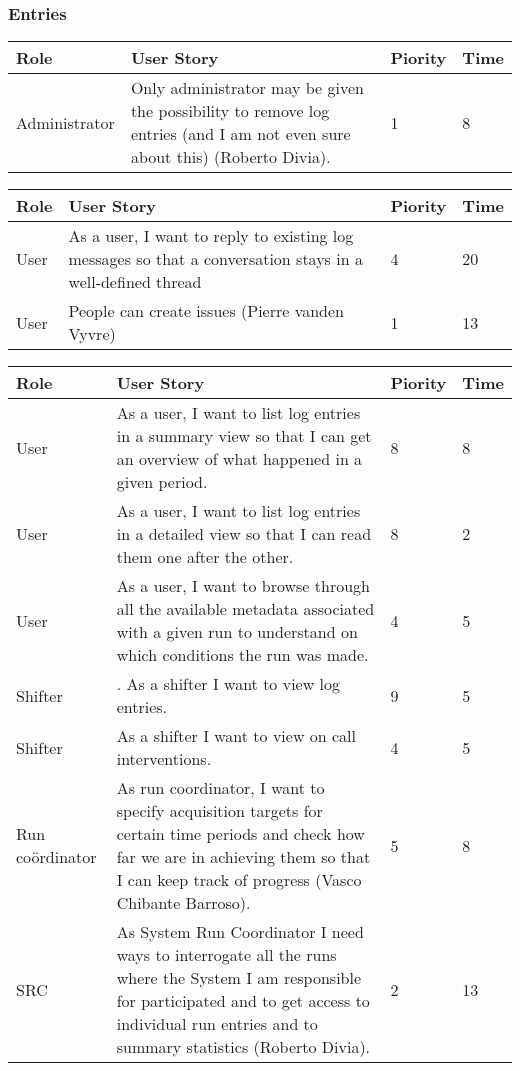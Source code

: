 
\subsubsection{Entries}
\begin{longtable}{ | p{2cm} | p{8cm} | p{1.5cm} | l |}
\hline
Role & User Story & Piority & Time \\ \hline
Administrator &  Only administrator may be given the possibility to remove log entries
(and I am not even sure about this) (Roberto Divia). & 1 & 8 \\ \hline
\end{longtable}

\begin{longtable}{ | p{2cm} | p{8cm} | p{1.5cm} | l |}
\hline
Role & User Story & Piority & Time \\ \hline
User &  As a user, I want to reply to existing log messages so that a conversation stays in a well-defined thread & 4 & 20 \\ \hline
User &  People can create issues (Pierre vanden Vyvre) & 1 & 13 \\ \hline


\end{longtable}

\begin{longtable}{ | p{2cm} | p{8cm} | p{1.5cm} | l |}
\hline
Role & User Story & Piority & Time \\ \hline
User &  As a user, I want to list log entries in a summary view so that I can
get an overview of what happened in a given period. & 8 & 8 \\ \hline
User &  As a user, I want to list log entries in a detailed view so that I can read them one after the other. & 8 & 2 \\ \hline
User &  As a user, I want to browse through all the available metadata associated with a given run to understand on which conditions the run was made. & 4 & 5 \\ \hline
Shifter & . As a shifter I want to view log entries. & 9 & 5 \\ \hline
Shifter &  As a shifter I want to view on call interventions. & 4 & 5 \\ \hline
Run coördinator &  As run coordinator, I want to specify acquisition targets for certain
time periods and check how far we are in achieving them so that I can
keep track of progress (Vasco Chibante Barroso). & 5 & 8 \\ \hline
SRC &  As System Run Coordinator I need ways to interrogate all the runs where the System I am responsible for participated and to get access to individual run entries and to summary statistics (Roberto Divia). & 2 & 13 \\ \hline
\end{longtable}

